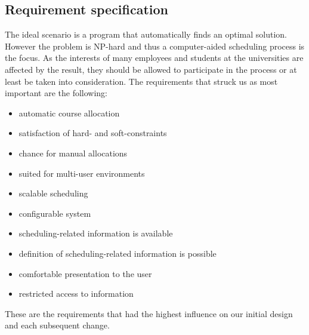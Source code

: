 \subsection{Requirement specification}
The ideal scenario is a program that automatically finds an optimal solution. However the problem is NP-hard and thus a computer-aided scheduling process is the focus. As the interests of many employees and students at the universities are affected by the result, they should be allowed to participate in the process or at least be taken into consideration. The requirements that struck us as most important are the following:
\begin{itemize}
	\item automatic course allocation
	\item satisfaction of hard- and soft-constraints
	\item chance for manual allocations
	\item suited for multi-user environments
	\item scalable scheduling
	\item configurable system
	\item scheduling-related information is available
	\item definition of scheduling-related information is possible
	\item comfortable presentation to the user
	\item restricted access to information
\end{itemize}
These are the requirements that had the highest influence on our initial design and each subsequent change.

